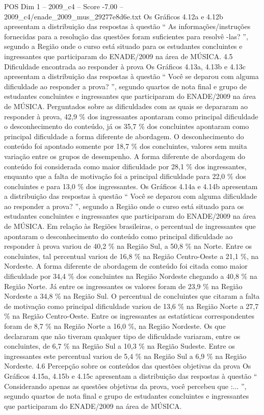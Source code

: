 \begin{textsample}{POS Dim 1 – 2009\_c4 – Score -7.00 – 2009\_c4/enade\_2009\_mus\_29277e8d6e.txt}
Os Gráficos 4.12a e 4.12b apresentam a distribuição das respostas à questão “ As informações/instruções fornecidas para a resolução das questões foram suficientes para resolvê -las? ”, segundo a Região onde o curso está situado para os estudantes concluintes e ingressantes que participaram do ENADE/2009 na área de MÚSICA. 4.5 Dificuldade encontrada ao responder à prova Os Gráficos 4.13a, 4.13b e 4.13c apresentam a distribuição das respostas à questão “ Você se deparou com alguma dificuldade ao responder a prova? ”, segundo quartos de nota final e grupo de estudantes concluintes e ingressantes que participaram do ENADE/2009 na área de MÚSICA.
Perguntados sobre as dificuldades com as quais se depararam ao responder à prova, 42,9 \% dos ingressantes apontaram como principal dificuldade o desconhecimento do conteúdo, já os 35,7 \% dos concluintes apontaram como principal dificuldade a forma diferente de abordagem.
O desconhecimento do conteúdo foi apontado somente por 18,7 \% dos concluintes, valores sem muita variação entre os grupos de desempenho.
A forma diferente de abordagem do conteúdo foi considerada como maior dificuldade por 28,1 \% dos ingressantes, enquanto que a falta de motivação foi a principal dificuldade para 22,0 \% dos concluintes e para 13,0 \% dos ingressantes.
Os Gráficos 4.14a e 4.14b apresentam a distribuição das respostas à questão “ Você se deparou com alguma dificuldade ao responder a prova? ”, segundo a Região onde o curso está situado para os estudantes concluintes e ingressantes que participaram do ENADE/2009 na área de MÚSICA.
Em relação às Regiões brasileiras, o percentual de ingressantes que apontaram o desconhecimento do conteúdo como principal dificuldade ao responder à prova variou de 40,2 \% na Região Sul, a 50,8 \% na Norte.
Entre os concluintes, tal percentual variou de 16,8 \% na Região Centro-Oeste a 21,1 \%, na Nordeste.
A forma diferente de abordagem de conteúdo foi citada como maior dificuldade por 34,4 \% dos concluintes na Região Nordeste chegando a 40,8 \% na Região Norte.
Já entre os ingressantes os valores foram de 23,9 \% na Região Nordeste a 34,8 \% na Região Sul.
O percentual de concluintes que citaram a falta de motivação como principal dificuldade variou de 13,6 \% na Região Norte a 27,7 \% na Região Centro-Oeste.
Entre os ingressantes as estatísticas correspondentes foram de 8,7 \% na Região Norte a 16,0 \%, na Região Nordeste.
Os que declararam que não tiveram qualquer tipo de dificuldade variaram, entre os concluintes, de 6,7 \% na Região Sul a 10,3 \% na Região Sudeste.
Entre os ingressantes este percentual variou de 5,4 \% na Região Sul a 6,9 \% na Região Nordeste. 4.6 Percepção sobre os conteúdos das questões objetivas da prova Os Gráficos 4.15a, 4.15b e 4.15c apresentam a distribuição das respostas à questão “ Considerando apenas as questões objetivas da prova, você percebeu que :... ”, segundo quartos de nota final e grupo de estudantes concluintes e ingressantes que participaram do ENADE/2009 na área de MÚSICA.

\end{textsample}
